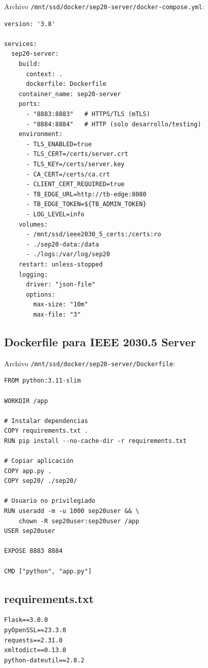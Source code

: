 Archivo \texttt{/mnt/ssd/docker/sep20-server/docker-compose.yml}:

\begin{verbatim}
version: '3.8'

services:
  sep20-server:
    build:
      context: .
      dockerfile: Dockerfile
    container_name: sep20-server
    ports:
      - "8883:8883"   # HTTPS/TLS (mTLS)
      - "8884:8884"   # HTTP (solo desarrollo/testing)
    environment:
      - TLS_ENABLED=true
      - TLS_CERT=/certs/server.crt
      - TLS_KEY=/certs/server.key
      - CA_CERT=/certs/ca.crt
      - CLIENT_CERT_REQUIRED=true
      - TB_EDGE_URL=http://tb-edge:8080
      - TB_EDGE_TOKEN=${TB_ADMIN_TOKEN}
      - LOG_LEVEL=info
    volumes:
      - /mnt/ssd/ieee2030_5_certs:/certs:ro
      - ./sep20-data:/data
      - ./logs:/var/log/sep20
    restart: unless-stopped
    logging:
      driver: "json-file"
      options:
        max-size: "10m"
        max-file: "3"
\end{verbatim}

\subsection{Dockerfile para IEEE 2030.5 Server}

Archivo \texttt{/mnt/ssd/docker/sep20-server/Dockerfile}:

\begin{verbatim}
FROM python:3.11-slim

WORKDIR /app

# Instalar dependencias
COPY requirements.txt .
RUN pip install --no-cache-dir -r requirements.txt

# Copiar aplicación
COPY app.py .
COPY sep20/ ./sep20/

# Usuario no privilegiado
RUN useradd -m -u 1000 sep20user && \
    chown -R sep20user:sep20user /app
USER sep20user

EXPOSE 8883 8884

CMD ["python", "app.py"]
\end{verbatim}

\subsection{requirements.txt}

\begin{verbatim}
Flask==3.0.0
pyOpenSSL==23.3.0
requests==2.31.0
xmltodict==0.13.0
python-dateutil==2.8.2
\end{verbatim}

